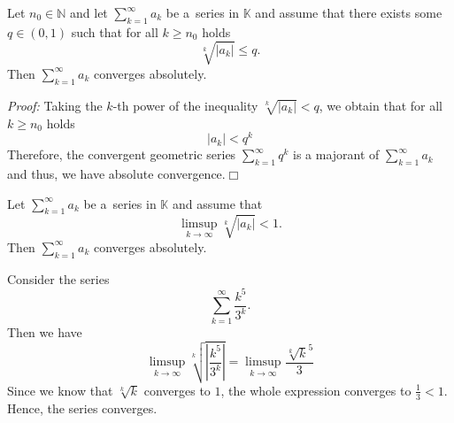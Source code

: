 

\begin{Theorem}\label{thm:rootkrit}
Let $n_0\in\mathbb{N}$ and let $\sum_{k=1}^\infty a_k$ be a~series in $\mathbb{K}$ and assume that there exists some $q\in(0,1)$ such that for all $k\geq n_0$ holds
\[\sqrt[k]{|a_{k}|} \leq q.\]
Then $\sum_{k=1}^\infty a_k$ converges absolutely.
\end{Theorem}

{\em Proof:} Taking the $k$-th power of the inequality $\sqrt[k]{|a_{k}|}<q$, we obtain that for all $k\geq n_0$ holds
\[|a_k|< q^{k}\]
Therefore, the convergent geometric series $\sum_{k=1}^\infty q^{k}$ is a majorant of $\sum_{k=1}^\infty a_k$ and thus, 
we have absolute convergence.\hfill$\Box$

\begin{Theorem}\label{thm:rootkritlim}
Let $\sum_{k=1}^\infty a_k$ be a~series in $\mathbb{K}$ and assume that
\[\limsup_{k \rightarrow \infty} \sqrt[k]{|a_{k}|}<1.\]
Then $\sum_{k=1}^\infty a_k$ converges absolutely.
\end{Theorem}

\begin{example}
 Consider the series
\[\sum_{k=1}^\infty \frac{k^5}{3^k}.\]
Then we have
\[\limsup_{k \rightarrow \infty} \sqrt[k]{\left|\frac{k^5}{3^k}\right|}
=\limsup_{k \rightarrow \infty} \frac{\sqrt[k]{k}^5}{3}
\]
Since we know that $\sqrt[k]{k}$ converges to $1$, the whole expression converges to $\frac13<1$. Hence, the series converges.
\end{example}

